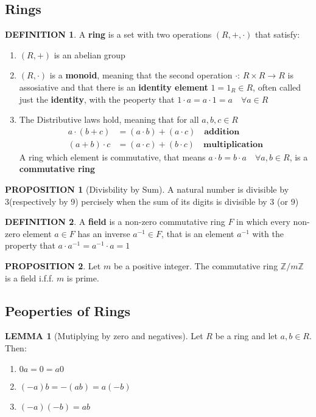 \documentclass[12pt]{article}
\theoremstyle{definition}
\newtheorem{definition}{DEFINITION}[subsection]
\newtheorem{lemma}{LEMMA}[subsection]
\newtheorem{prop}{PROPOSITION}[subsection]
\begin{document}
\subsection{Rings}
\begin{definition}
    A \textbf{ring} is a set with two operations $(R,+,\cdot)$ that satisfy:
    \begin{enumerate}
        \item $(R,+)$ is an abelian group
        \item $(R,\cdot)$ is a \textbf{monoid}, meaning that the second operation $\cdot$: $R\times R\rightarrow R$ is assosiative and that there is an \textbf{identity element} $1 = 1_R \in R$, often called just the \textbf{identity}, with the peoperty that $1\cdot a = a \cdot 1 = a \quad\forall a \in R$
        \item The Distributive laws hold, meaning that for all $a,b,c \in R$ \[\begin{split}
            a\cdot (b+c) &= (a\cdot b)+(a \cdot c)\quad \textbf{addition}\\
            (a+b) \cdot c &= (a \cdot c) + (b \cdot c) \quad \textbf{multiplication}
        \end{split}\]
    A ring which element is commutative, that means $a \cdot b = b \cdot a \quad \forall a,b \in R$, is a \textbf{commutative ring}
    \end{enumerate}
\end{definition}

\begin{prop}[Divisbility by Sum]
    A natural number is divisible by 3(respectively by 9) percisely when the sum of its digits is divisible by 3 (or 9)
\end{prop}

\begin{definition}
    A \textbf{field} is a non-zero commutative ring $F$ in which every non-zero element $a\in F$ has an inverse $a^{-1} \in F$, that is an element $a^{-1}$ with the property that $a\cdot a^{-1} = a^{-1}\cdot a = 1$
\end{definition}

\begin{prop}
    Let $m$ be a positive integer. The commutative ring $\mathbb{Z}/m\mathbb{Z}$ is a field i.f.f. $m$ is prime.
\end{prop}

\subsection{Peoperties of Rings}
\begin{lemma}[Mutiplying by zero and negatives]
    Let $R$ be a ring and let $a,b \in R$. Then:
    \begin{enumerate}
        \item $0a = 0 = a0$
        \item $(-a)b = -(ab) = a(-b)$
        \item $(-a)(-b) = ab$
    \end{enumerate}
\end{lemma}
\end{document}
